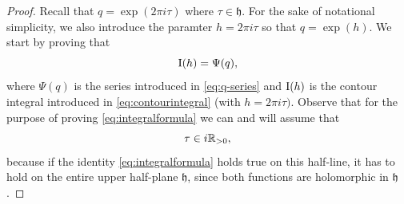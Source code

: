   \begin{proof}
  	Recall that  $q=\exp(2\pi i \tau)$  where $\tau \in \mathfrak{h}$.  For the sake of notational simplicity, we also introduce the paramter $h=2\pi i \tau$ so that $q=\exp(h)$.  We start by proving that
  	\begin{equation} \label{eq:integralformula}
  	\operatorname{I}(h)=\Psi(q),
  	\end{equation}
  	where $\Psi(q)$ is the series introduced in \eqref{eq:q-series} and $\operatorname{I}(h)$ is the contour integral introduced in \eqref{eq:contourintegral} (with $h=2\pi i \tau)$. Observe that for the purpose of proving \eqref{eq:integralformula} we can and will assume that
  	$$\tau \in i \mathbb{R}_{>0},$$
  	because if the identity \eqref{eq:integralformula} holds true on this half-line, it has to hold on the entire upper half-plane $\mathfrak{h}$, since both functions are holomorphic in $\mathfrak{h}$. 
  

\end{proof}
